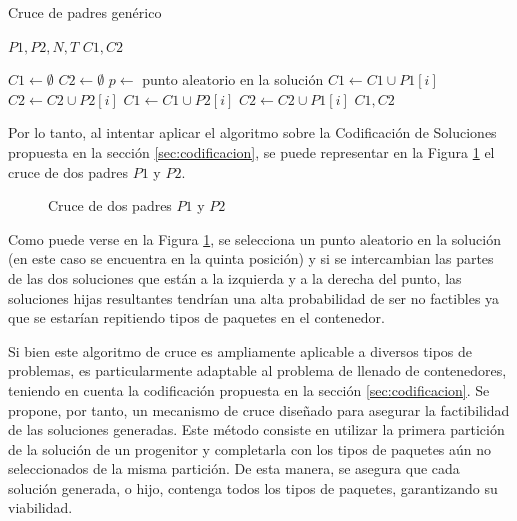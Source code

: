 \begin{algorithm}[H]
    \caption{Cruce de padres genérico}\label{alg:crucePadresGenerico}
    \begin{algorithmic}[1]
        \Require $P1, P2, N, T$
        \Ensure $C1, C2$

        \State $C1 \leftarrow \emptyset$
        \State $C2 \leftarrow \emptyset$
        \State $p \leftarrow$ punto aleatorio en la solución
        \State $C1 \leftarrow C1 \cup P1[i]$
        \State $C2 \leftarrow C2 \cup P2[i]$
        \Else
        \State $C1 \leftarrow C1 \cup P2[i]$
        \State $C2 \leftarrow C2 \cup P1[i]$
        \EndIf
        \EndFor
        \State \Return $C1, C2$
    \end{algorithmic}
\end{algorithm}

Por lo tanto, al intentar aplicar el algoritmo sobre la Codificación de Soluciones propuesta en la sección \ref{sec:codificacion}, se puede representar en la Figura \ref{fig:cruce_simple} el cruce de dos padres $P1$ y $P2$.

\begin{figure}[H]
    \centering
    
    \caption{Cruce de dos padres $P1$ y $P2$}
    \label{fig:cruce_simple}
\end{figure}

Como puede verse en la Figura \ref{fig:cruce_simple}, se selecciona un punto aleatorio en la solución (en este caso se encuentra en la quinta posición) y si se intercambian las partes de las dos soluciones que están a la izquierda y a la derecha del punto, las soluciones hijas resultantes tendrían una alta probabilidad de ser no factibles ya que se estarían repitiendo tipos de paquetes en el contenedor.

Si bien este algoritmo de cruce es ampliamente aplicable a diversos tipos de problemas, es particularmente adaptable al problema de llenado de contenedores, teniendo en cuenta la codificación propuesta en la sección \ref{sec:codificacion}. Se propone, por tanto, un mecanismo de cruce diseñado para asegurar la factibilidad de las soluciones generadas. Este método consiste en utilizar la primera partición de la solución de un progenitor y completarla con los tipos de paquetes aún no seleccionados de la misma partición. De esta manera, se asegura que cada solución generada, o hijo, contenga todos los tipos de paquetes, garantizando su viabilidad.


